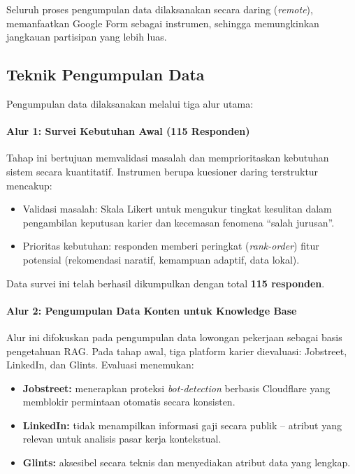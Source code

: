Seluruh proses pengumpulan data dilaksanakan secara daring (\textit{remote}), memanfaatkan
Google Form sebagai instrumen, sehingga memungkinkan jangkauan partisipan yang lebih luas.

\subsection{Teknik Pengumpulan Data}
Pengumpulan data dilaksanakan melalui tiga alur utama:

\paragraph{Alur 1: Survei Kebutuhan Awal (115 Responden)}
Tahap ini bertujuan memvalidasi masalah dan memprioritaskan kebutuhan sistem secara
kuantitatif. Instrumen berupa kuesioner daring terstruktur mencakup:
\begin{itemize}[noitemsep]
  \item Validasi masalah: Skala Likert untuk mengukur tingkat kesulitan dalam pengambilan
    keputusan karier dan kecemasan fenomena ``salah jurusan''.
  \item Prioritas kebutuhan: responden memberi peringkat (\textit{rank-order}) fitur
    potensial (rekomendasi naratif, kemampuan adaptif, data lokal).
\end{itemize}
Data survei ini telah berhasil dikumpulkan dengan total \textbf{115 responden}.

\paragraph{Alur 2: Pengumpulan Data Konten untuk Knowledge Base}
Alur ini difokuskan pada pengumpulan data lowongan pekerjaan sebagai basis pengetahuan RAG.
Pada tahap awal, tiga platform karier dievaluasi: Jobstreet, LinkedIn, dan Glints.
Evaluasi menemukan:

\begin{itemize}[noitemsep]
  \item \textbf{Jobstreet:} menerapkan proteksi \textit{bot-detection} berbasis Cloudflare
    yang memblokir permintaan otomatis secara konsisten.
  \item \textbf{LinkedIn:} tidak menampilkan informasi gaji secara publik -- atribut yang
    relevan untuk analisis pasar kerja kontekstual.
  \item \textbf{Glints:} aksesibel secara teknis dan menyediakan atribut data yang lengkap.
\end{itemize}


